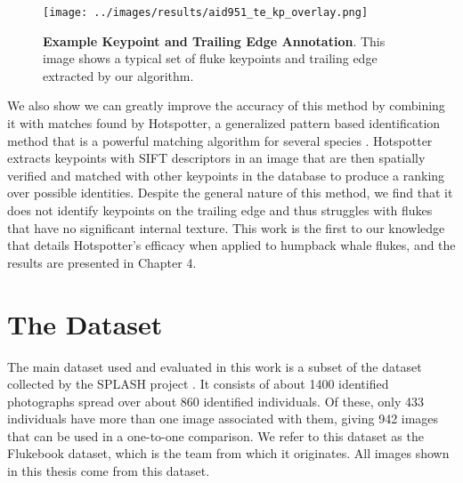 
\begin{figure}[t]%
\centering
\texttt{[image: ../images/results/aid951\_te\_kp\_overlay.png]}
\caption{\textbf{Example Keypoint and Trailing Edge Annotation}. This image shows a typical set of fluke keypoints and trailing edge extracted by our algorithm.}
\label{fig:example_overlay}
\end{figure}

We also show we can greatly improve the accuracy of this method by combining it with matches found by Hotspotter, a generalized pattern based identification method that is a powerful matching algorithm for several species \cite{crall_hotspotter_2013}.
Hotspotter extracts keypoints with SIFT descriptors \cite{lowe2004distinctive} in an image that are then spatially verified and matched with other keypoints in the database to produce a ranking over possible identities. 
Despite the general nature of this method, we find that it does not identify keypoints on the trailing edge and thus struggles with flukes that have no significant internal texture. 
This work is the first to our knowledge that details Hotspotter's efficacy when applied to humpback whale flukes, and the results are presented in Chapter 4.

\section{The Dataset}

The main dataset used and evaluated in this work is a subset of the dataset collected by the SPLASH project \cite{calambokidis2008splash}. 
It consists of about 1400 identified photographs spread over about 860 identified individuals.
Of these, only 433 individuals have more than one image associated with them, giving 942 images that can be used in a one-to-one comparison.
We refer to this dataset as the Flukebook dataset, which is the team from which it originates.
All images shown in this thesis come from this dataset.

